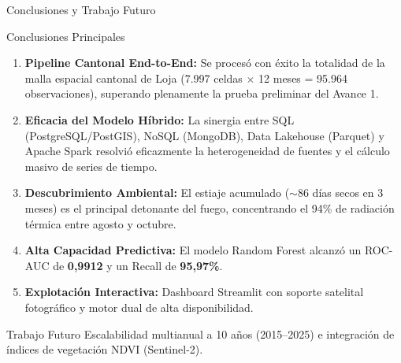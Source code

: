 \documentclass[aspectratio=169,11pt]{beamer}
\newcommand{\seccionactual}{Sustentaci\'on Final}
\begin{document}
\renewcommand{\seccionactual}{Conclusiones}
\begin{frame}{Conclusiones y Trabajo Futuro}
  \begin{alertblock}{Conclusiones Principales}
    \begin{enumerate}\footnotesize
      \item \textbf{Pipeline Cantonal End-to-End:} Se proces\'o con \'exito la totalidad de la malla espacial cantonal de Loja (7.997 celdas $\times$ 12 meses = 95.964 observaciones), superando plenamente la prueba preliminar del Avance 1.
      \item \textbf{Eficacia del Modelo H\'ibrido:} La sinergia entre SQL (PostgreSQL/PostGIS), NoSQL (MongoDB), Data Lakehouse (Parquet) y Apache Spark resolvi\'o eficazmente la heterogeneidad de fuentes y el c\'alculo masivo de series de tiempo.
      \item \textbf{Descubrimiento Ambiental:} El estiaje acumulado ($\sim$86 d\'ias secos en 3 meses) es el principal detonante del fuego, concentrando el 94\% de radiaci\'on t\'ermica entre agosto y octubre.
      \item \textbf{Alta Capacidad Predictiva:} El modelo Random Forest alcanz\'o un ROC-AUC de \textbf{0,9912} y un Recall de \textbf{95,97\%}.
      \item \textbf{Explotaci\'on Interactiva:} Dashboard Streamlit con soporte satelital fotogr\'afico y motor dual de alta disponibilidad.
    \end{enumerate}
  \end{alertblock}
  \vspace{0.2cm}
  \begin{block}{Trabajo Futuro}\footnotesize
    Escalabilidad multianual a 10 a\~nos (2015--2025) e integraci\'on de \'indices de vegetaci\'on NDVI (Sentinel-2).
  \end{block}
\end{frame}
\end{document}
